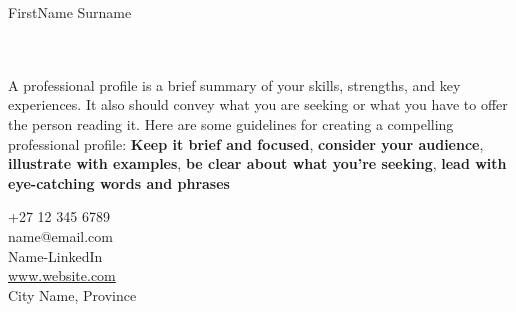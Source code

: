 \documentclass[12pt, a4paper, conference]{IEEEtran}
\begin{document}
\begin{minipage}{\textwidth}
{\fontsize{50}{1}\selectfont FirstName \color{orange}Surname}
\\
\end{minipage}

\noindent\makebox[\linewidth]{\rule{\paperwidth}{1pt}}


\begin{minipage}[t][5cm][t]{0.7\textwidth}
{}\\
\\
A professional profile is a brief summary of your skills, strengths, and key experiences. It also should convey what you are seeking or what you have to offer the person reading it. Here are some guidelines for creating a compelling professional profile: \textbf{Keep it brief and focused}, \textbf{consider your audience}, \textbf{illustrate with examples}, \textbf{be clear about what you're seeking}, \textbf{lead with eye-catching words and phrases} 
\end{minipage}
\quad
\vrule height 3ex width 1pt
\quad
\begin{minipage}[t][5cm][t]{0.2\textwidth}
+27 12 345 6789\\

name@email.com\\

Name-LinkedIn\\

\url{www.website.com}\\

City Name, Province
\end{minipage}

\noindent\makebox[\linewidth]{\rule{\paperwidth}{1pt}}
\end{document}
